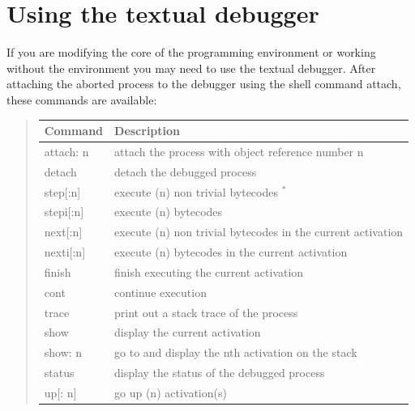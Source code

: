 \documentclass[letterpaper,10pt,english]{sphinxmanual}
\begin{document}
\section{Using the textual debugger}
\label{textdebug:using-the-textual-debugger}\label{textdebug::doc}
If you are modifying the core of the programming environment or working without the environment
you may need to use the textual debugger. After attaching the aborted process to the debugger
using the shell command attach, these commands are available:
\begin{quote}

\begin{tabulary}{\linewidth}{|L|L|}
\hline

Command
 & 
Description
\\\hline

attach: n
 & 
attach the process with object reference number n
\\\hline

detach
 & 
detach the debugged process
\\\hline

step{[}:n{]}
 & 
execute (n) non trivial bytecodes $^{\text{*}}$
\\\hline

stepi{[}:n{]}
 & 
execute (n) bytecodes
\\\hline

next{[}:n{]}
 & 
execute (n) non trivial bytecodes in the current activation
\\\hline

nexti{[}:n{]}
 & 
execute (n) bytecodes in the current activation
\\\hline

finish
 & 
finish executing the current activation
\\\hline

cont
 & 
continue execution
\\\hline

trace
 & 
print out a stack trace of the process
\\\hline

show
 & 
display the current activation
\\\hline

show: n
 & 
go to and display the nth activation on the stack
\\\hline

status
 & 
display the status of the debugged process
\\\hline

up{[}: n{]}
 & 
go up (n) activation(s)
\\\hline


\end{tabulary}
\end{quote}
\end{document}
